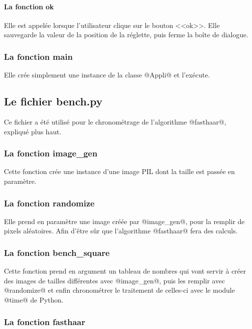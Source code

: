 \documentclass{article}
\begin{document}
\paragraph{La fonction ok}

Elle est appelée lorsque l'utilisateur clique sur le bouton <<ok>>. Elle sauvegarde la valeur de la position de la réglette, puis ferme la boîte de dialogue.

\subsubsection{La fonction main}

Elle crée simplement une instance de la classe @Appli@ et l'exécute.


\subsection{Le fichier bench.py}

Ce fichier a été utilisé pour le chronométrage de l'algorithme @fasthaar@, expliqué plus haut.

\subsubsection{La fonction image\_gen}

Cette fonction crée une instance d'une image PIL dont la taille est passée en paramètre.

\subsubsection{La fonction randomize}

Elle prend en paramètre une image créée par @image_gen@, pour la remplir de pixels aléatoires. Afin d'être sûr que l'algorithme @fasthaar@ fera des calculs.

\subsubsection{La fonction bench\_square}

Cette fonction prend en argument un tableau de nombres qui vont servir à créer des images de tailles différentes avec @image_gen@, puis les remplir avec @randomize@ et enfin chronométrer le traitement de celles-ci avec le module @time@ de Python.

\subsubsection{La fonction fasthaar}
\end{document}
